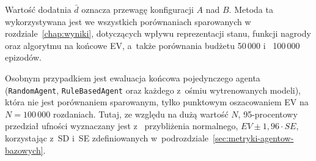 Wartość dodatnia $\bar d$ oznacza przewagę konfiguracji $A$ nad $B$. Metoda
ta wykorzystywana jest we wszystkich porównaniach sparowanych w~
rozdziale~\ref{chap:wyniki}, dotyczących wpływu reprezentacji stanu, funkcji nagrody
oraz algorytmu na końcowe EV, a~także porównania budżetu 50\,000 i~
100\,000 epizodów.

Osobnym przypadkiem jest ewaluacja końcowa pojedynczego agenta
(\texttt{RandomAgent}, \texttt{RuleBasedAgent} oraz każdego z~ośmiu
wytrenowanych modeli), która nie jest porównaniem sparowanym, tylko
punktowym oszacowaniem EV na $N=100\,000$ rozdaniach. Tutaj, ze względu na
dużą wartość $N$, 95-procentowy przedział ufności wyznaczany jest z~
przybliżenia normalnego, $EV \pm 1{,}96 \cdot SE$, korzystając z~SD i~SE
zdefiniowanych w~podrozdziale~\ref{sec:metryki-agentow-bazowych}.
